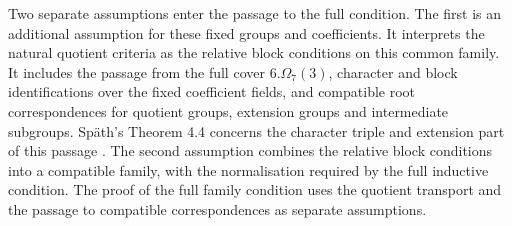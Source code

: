 Two separate assumptions enter the passage to the full condition.
The first is an additional assumption for these fixed groups and
coefficients. It interprets the natural quotient criteria as the relative
block conditions on this common family. It includes the passage from
the full cover $6.\Omega_7(3)$, character and block identifications
over the fixed coefficient fields, and compatible root correspondences
for quotient groups, extension groups and intermediate subgroups.
Sp\"ath's Theorem 4.4 concerns the character triple and extension
part of this passage \cite{Spath2017Triples}. The second assumption
combines the relative block conditions into a compatible family,
with the normalisation required by the full inductive condition.
The proof of the full family condition uses the quotient transport and
the passage to compatible correspondences as separate assumptions.

